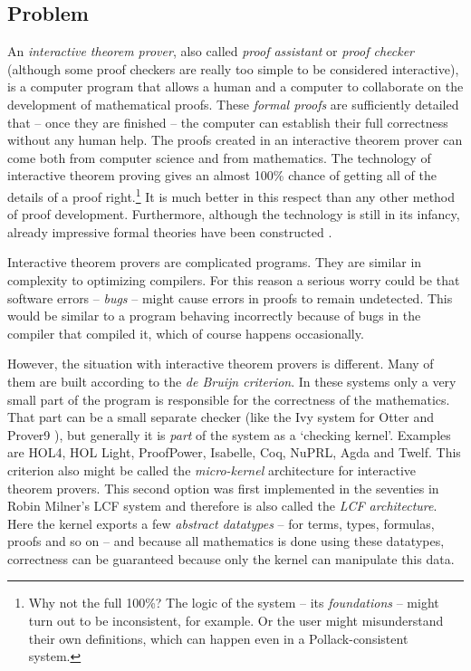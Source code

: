 \documentclass{entcs}
\begin{document}
\subsection{Problem}

An \emph{interactive theorem prover}, also called \emph{proof assistant}
or \emph{proof checker} (although some proof checkers are really too simple
to be considered interactive), is a computer program that allows a human and
a computer to collaborate on the development of mathematical proofs.
These \emph{formal proofs} are sufficiently detailed that -- once they are finished -- the computer
can establish their full correctness without any human help.
The proofs created in an interactive theorem prover can
come both from computer science and from mathematics.
The technology of interactive theorem proving gives an almost 100\% chance of getting all of the details
of a proof right.\footnote{Why not the full 100\%?
The logic of the system -- its \emph{foundations} -- might turn out to be inconsistent, for example.
Or the user might misunderstand their own definitions, which can happen even
in a Pollack-consistent system.
}
It is much better in this respect than any other method of
proof development.
Furthermore, although the technology is still in its infancy, already
impressive formal theories have been constructed \cite{fox:03,gon:06,har:08,kle:09,ler:06}.

Interactive theorem provers are complicated programs.
They are similar in complexity to optimizing compilers.
For this reason a serious worry could be that software errors -- \emph{bugs} --
might cause errors in proofs to remain undetected.
This would be similar to a program behaving incorrectly
because of bugs in the compiler that compiled it,
which of course happens occasionally.

However, the situation with interactive theorem provers is different.
Many of them are built according to the \emph{de Bruijn criterion}.
In these systems only a very small part of the program is responsible
for the correctness of the mathematics.
That part can be a small separate checker (like the Ivy system
for Otter and Prover9 \cite{mcc:shu:00}),
but generally it is \emph{part} of the system as a `checking kernel'.
Examples are {\small HOL}4, {\small HOL} Light, ProofPower, Isabelle, Coq, Nu{\small PRL}, Agda and Twelf.
This criterion also might be called the \emph{micro-kernel} architecture for
interactive theorem provers.
This second option was first implemented in the seventies in Robin Milner's {\small LCF}
system and therefore is also called the \emph{{\small LCF} architecture}.
Here the kernel exports a few \emph{abstract datatypes} --
for terms, types, formulas, proofs and so on --
and because all mathematics is done using these datatypes, correctness
can be guaranteed because only the kernel can manipulate this data.
\end{document}
